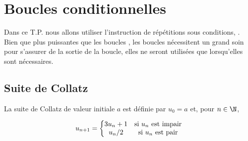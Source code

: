 \chapter{Boucles conditionnelles}
\thispagestyle{empty}
{\sf Dans ce T.P. nous allons utiliser l'instruction de répétitions sous conditions, . Bien que plus puissantes que les boucles , les boucles  nécessitent un grand soin pour s'assurer de la sortie de la boucle, elles ne seront utilisées que lorsqu'elles sont nécessaires.}
\section{Suite de Collatz} 
La suite de Collatz de valeur initiale $a$ est définie par $u_0=a$ et, pour $n\in \N$,

\[
u_{n+1} = \left\{\begin{matrix}3 u_n + 1&\hbox{si $u_n$ est impair}\\
u_n/2&\hbox{si $u_n$ est pair}
\end{matrix}\right.\]

